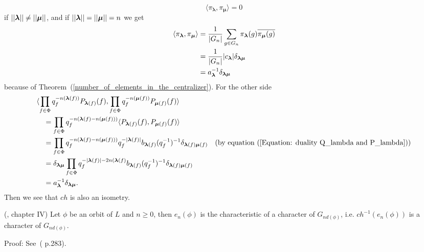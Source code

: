 \begin{equation}
    \langle \pi_{\boldsymbol{\lambda}},\pi_{\boldsymbol{\mu}}\rangle=0
\end{equation}
if $||\boldsymbol{\lambda}||\neq||\boldsymbol{\mu}||$, and if $||\boldsymbol{\lambda}||=||\boldsymbol{\mu}||=n$ we get
\begin{equation}
\begin{split}
      \langle\pi_{\boldsymbol{\lambda}},\pi_{\boldsymbol{\mu}}\rangle &= \frac{1}{|G_n|}\sum_{g\in G_n}\pi_{\boldsymbol{\lambda}}(g)\overline{\pi_{\boldsymbol{\mu}}(g)}\\
      &=\frac{1}{|G_n|}|c_{\boldsymbol{\lambda}}|\delta_{\boldsymbol{\lambda}\boldsymbol{\mu}}\\
      &=a_{\boldsymbol{\lambda}}^{-1}\delta_{\boldsymbol{\lambda}\boldsymbol{\mu}}
\end{split}
\end{equation}
because of Theorem~(\ref{number_of_elements_in_the_centralizer}). For the other side
\begin{equation}
\begin{split}
     &\langle \prod_{f\in\Phi}q_f^{-n(\boldsymbol{\lambda}(f))}P_{\boldsymbol{\lambda}(f)}(f),\prod_{f\in\Phi}q_f^{-n(\boldsymbol{\mu}(f))}P_{\boldsymbol{\mu}(f)}(f)\rangle \\
     &\quad= \prod_{f\in\Phi}q_f^{-n(\boldsymbol{\lambda}(f)-n(\boldsymbol{\mu}(f)))}\langle P_{\boldsymbol{\lambda}(f)}(f),P_{\boldsymbol{\mu}(f)}(f) \rangle\\
     &\quad=\prod_{f\in\Phi}q_f^{-n(\boldsymbol{\lambda}(f)-n(\boldsymbol{\mu}(f)))}q_{f}^{-|\boldsymbol{\lambda}(f)|}b_{\boldsymbol{\lambda}(f)}(q_f^{-1})^{-1}\delta_{\boldsymbol{\lambda}(f)\boldsymbol{\mu}(f)}\quad(\text{by equation~(\ref{Equation: duality Q_lambda and P_lambda})})\\
     &\quad=\delta_{\boldsymbol{\lambda}\boldsymbol{\mu}}\prod_{f\in\Phi}q_f^{-|\boldsymbol{\lambda}(f)|-2n(\boldsymbol{\lambda}(f)}b_{\boldsymbol{\lambda}(f)}(q_f^{-1})^{-1}\delta_{\boldsymbol{\lambda}(f)\boldsymbol{\mu}(f)}\\
     &\quad=a_{\boldsymbol{\lambda}}^{-1}\delta_{\boldsymbol{\lambda}\boldsymbol{\mu}}.
\end{split}
\end{equation}
Then we see that $ch$ is also an isometry.
\begin{dang}
    \begin{theorem}(\cite{macdonald1998symmetric}, chapter IV)\label{Theorem: S_tlambda is the characteristic of a character of G_||tlambda||}
        Let $\phi$ be an orbit of $L$ and $n\geq0$, then $e_n(\phi)$ is the characteristic of a character of $G_{nd(\phi)}$, i.e. $ch^{-1}(e_n(\phi))$ is a character of $G_{nd(\phi)}$.
    \end{theorem}
\end{dang}
Proof: See~(\cite{macdonald1998symmetric} p.283).\par

